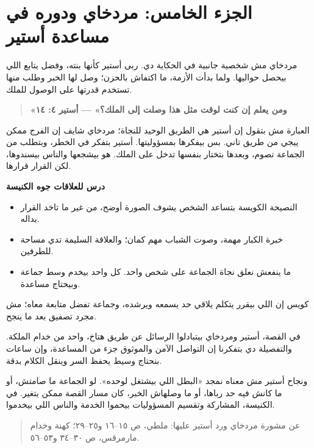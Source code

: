 \documentclass[12pt,a4paper]{article}
\begin{document}
\section*{الجزء الخامس: مردخاي ودوره في مساعدة أستير}
مردخاي مش شخصية جانبية في الحكاية دي. ربى أستير كأنها بنته، وفضل يتابع اللي بيحصل حواليها. ولما بدأت الأزمة، ما اكتفاش بالحزن؛ وصل لها الخبر وطلب منها تستخدم قدرتها على الوصول للملك.\par\medskip
\begin{quote}\large\textbf{«ومن يعلم إن كنت لوقت مثل هذا وصلت إلى الملك؟» — أستير ٤: ١٤}\end{quote}
العبارة مش بتقول إن أستير هي الطريق الوحيد للنجاة؛ مردخاي شايف إن الفرج ممكن ييجي من طريق تاني. بس بيفكرها بمسؤوليتها. أستير بتفكر في الخطر، وبتطلب من الجماعة تصوم، وبعدها بتختار بنفسها تدخل على الملك. هو بيشجعها والناس بيسندوها، لكن القرار قرارها.\par\medskip
\vspace{0.2em}\noindent\textcolor{ochre}{\textbf{درس للعلاقات جوه الكنيسة}}\par\smallskip
\begin{itemize}[rightmargin=1.2em,leftmargin=0.5em,itemsep=0.25em,topsep=0.2em]
\item النصيحة الكويسة بتساعد الشخص يشوف الصورة أوضح، من غير ما تاخد القرار بداله.
\item خبرة الكبار مهمة، وصوت الشباب مهم كمان؛ والعلاقة السليمة تدي مساحة للطرفين.
\item ما ينفعش نعلق نجاة الجماعة على شخص واحد. كل واحد بيخدم وسط جماعة وبيحتاج مساعدة.
\end{itemize}\medskip
كويس إن اللي بيقرر يتكلم يلاقي حد يسمعه ويرشده، وجماعة تفضل متابعة معاه؛ مش مجرد تصفيق بعد ما ينجح.\par\medskip
في القصة، أستير ومردخاي بيتبادلوا الرسائل عن طريق هتاخ، واحد من خدام الملكة. والتفصيلة دي بتفكرنا إن التواصل الآمن والموثوق جزء من المساعدة، وإن ساعات بنحتاج وسيط يحفظ السر وينقل الكلام بدقة.\par\medskip
ونجاح أستير مش معناه نمجد «البطل اللي بيشتغل لوحده». لو الجماعة ما صامتش، أو ما كانش فيه حد رباها، أو ما وصلهاش الخبر، كان مسار القصة ممكن يتغير. في الكنيسة، المشاركة وتقسيم المسؤوليات بيحموا الخدمة والناس اللي بيخدموا.\par\medskip
\begin{quote}\small\color{muted}عن مشورة مردخاي ورد أستير عليها: ملطي، ص ١٥–١٦ و٢٥–٢٩؛ كهنة وخدام مارمرقس، ص ٣٠–٣٤ و٥٣–٥٦.\end{quote}
\clearpage
\clearpage
\end{document}
